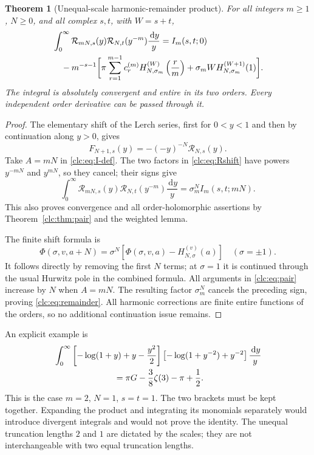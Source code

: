 \documentclass[11pt,a4paper]{article}
\numberwithin{equation}{section}
\newtheorem{theorem}{Theorem}[section]
\theoremstyle{definition}\newtheorem{definition}[theorem]{Definition}
\theoremstyle{remark}\newtheorem{remark}[theorem]{Remark}
\newcommand{\dd}{\,\mathrm d}
\begin{document}
\begin{theorem}[Unequal-scale harmonic-remainder product]
\label{clc:thm:remainder}
For all integers $m\ge1$, $N\ge0$, and all complex $s,t$, with $W=s+t$,
\begin{align}
 &\int_0^\infty\mathcal R_{mN,s}(y)
            \mathcal R_{N,t}(y^{-m})\frac{\dd y}{y}
 = I_m(s,t;0)\notag\\
 &\quad-m^{-s-1}\biggl[
 \pi\sum_{r=1}^{m-1}c_r^{(m)}
 H_{N,\sigma_m}^{(W)}\left(\frac r m\right)
 +\sigma_m W H_{N,\sigma_m}^{(W+1)}(1)\biggr].
 \label{clc:eq:remainder}
\end{align}
The integral is absolutely convergent and entire in its two orders.
Every independent order derivative can be passed through it.
\end{theorem}
\begin{proof}
The elementary shift of the Lerch series, first for $0<y<1$ and then
by continuation along $y>0$, gives
\begin{equation}\label{clc:eq:Rshift}
 F_{N+1,s}(y)=-(-y)^{-N}\mathcal R_{N,s}(y).
\end{equation}
Take $A=mN$ in \eqref{clc:eq:I-def}. The two factors in
\eqref{clc:eq:Rshift} have powers $y^{-mN}$ and $y^{mN}$, so they
cancel; their signs give
\[
 \int_0^\infty\mathcal R_{mN,s}(y)
       \mathcal R_{N,t}(y^{-m})\frac{\dd y}{y}
 =\sigma_m^N I_m(s,t;mN).
\]
This also proves convergence and all order-holomorphic assertions by
Theorem~\ref{clc:thm:pair} and the weighted lemma.

The finite shift formula is
\[
 \Phi(\sigma,v,a+N)=\sigma^N
             [\Phi(\sigma,v,a)-H_{N,\sigma}^{(v)}(a)]
 \quad(\sigma=\pm1).
\]
It follows directly by removing the first $N$ terms; at $\sigma=1$
it is continued through the usual Hurwitz pole in the combined formula.
All arguments in \eqref{clc:eq:pair} increase by $N$ when $A=mN$.
The resulting factor $\sigma_m^N$ cancels the preceding sign, proving
\eqref{clc:eq:remainder}. All harmonic corrections are finite entire
functions of the orders, so no additional continuation issue remains.
\end{proof}

An explicit example is
\begin{align}
 &\int_0^\infty
 \left[-\log(1+y)+y-\frac{y^2}{2}\right]
 \left[-\log(1+y^{-2})+y^{-2}\right]\frac{\dd y}{y}\notag\\
 &\hspace{25mm}=\pi G-\frac38\zeta(3)-\pi+\frac12.
 \label{clc:eq:Rexample}
\end{align}
This is the case $m=2$, $N=1$, $s=t=1$. The two brackets must be kept
together. Expanding the product and integrating its monomials separately
would introduce divergent integrals and would not prove the identity.
The unequal truncation lengths $2$ and $1$ are dictated by the scales;
they are not interchangeable with two equal truncation lengths.
\end{document}
